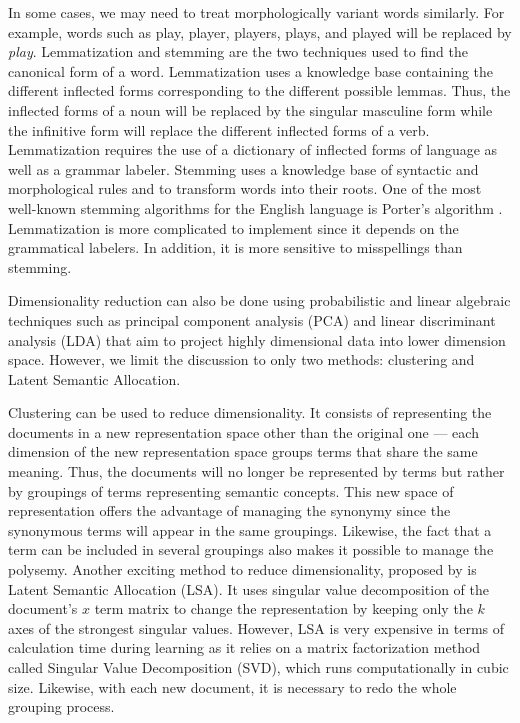 In some cases, we may need to treat morphologically variant words similarly. For example, words such as play, player, players, plays, and played will be replaced by \emph{play}. Lemmatization and stemming are the two techniques used to find the canonical form of a word. Lemmatization uses a knowledge base containing the different inflected forms corresponding to the different possible lemmas. Thus, the inflected forms of a noun will be replaced by the singular masculine form while the infinitive form will replace the different inflected forms of a verb. Lemmatization requires the use of a dictionary of inflected forms of language as well as a grammar labeler. Stemming uses a knowledge base of syntactic and morphological rules and to transform words into their roots. One of the most well-known stemming algorithms for the English language is Porter's algorithm \citep{porter1980algorithm}. Lemmatization is more complicated to implement since it depends on the grammatical labelers. In addition, it is more sensitive to misspellings than stemming.


Dimensionality reduction can also be done using probabilistic and linear algebraic techniques such as principal component analysis (PCA) and linear discriminant analysis (LDA) that aim to project highly dimensional data into lower dimension space. However, we limit the discussion to only two methods: clustering and Latent Semantic Allocation. 

Clustering \citep{baker1998distributional, sable2001using, slonim2001power} can be used to reduce dimensionality. It consists of representing the documents in a new representation space other than the original one — each dimension of the new representation space groups terms that share the same meaning. Thus, the documents will no longer be represented by terms but rather by groupings of terms representing semantic concepts. This new space of representation offers the advantage of managing the synonymy since the synonymous terms will appear in the same groupings. Likewise, the fact that a term can be included in several groupings also makes it possible to manage the polysemy. Another exciting method to reduce dimensionality, proposed by \cite{deerwester1990indexing} is Latent Semantic Allocation (LSA). It uses singular value decomposition of the document's $x$ term matrix to change the representation by keeping only the $k$ axes of the strongest singular values. However, LSA is very expensive in terms of calculation time during learning as it relies on a matrix factorization method called Singular Value Decomposition (SVD), which runs computationally in cubic size. Likewise, with each new document, it is necessary to redo the whole grouping process.

